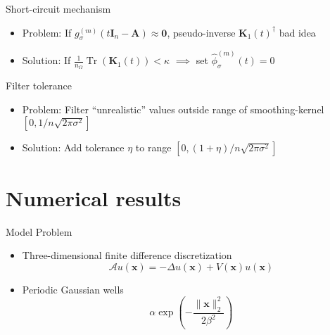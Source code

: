 \documentclass[aspectratio=169, 12pt]{beamer}
\newcommand{\mtx}[1]{\boldsymbol{#1}}
\newcommand{\vct}[1]{\boldsymbol{#1}}
\DeclareMathOperator{\Tr}{Tr}
\begin{document}
\begin{frame}{Short-circuit mechanism}
    \begin{itemize}
        \item Problem: If $g_{\sigma}^{(m)}(t\mtx{I}_n - \mtx{A}) \approx \mtx{0}$, pseudo-inverse $\mtx{K}_1(t)^{\dagger}$ bad idea
        \item Solution: If $\frac{1}{n_{\Omega}} \Tr(\mtx{K}_1(t)) < \kappa$ $\implies$ set $\widehat{\phi}_{\sigma}^{(m)}(t) = 0$
    \end{itemize}
    \centering
    \scalebox{0.8}{}
\end{frame}

\begin{frame}{Filter tolerance}
    \begin{itemize}
        \item Problem: Filter \enquote{unrealistic} values outside range of \gls{smoothing-kernel} $[0, 1/n\sqrt{2\pi\sigma^2}]$
        \item Solution: Add tolerance $\eta$ to range $[0, (1 + \eta)/n\sqrt{2\pi\sigma^2}]$
    \end{itemize}
    \centering
    \scalebox{0.8}{}
\end{frame}

\section{Numerical results}

\begin{frame}{Model Problem}
    \begin{itemize}
        \item Three-dimensional finite difference discretization \cite{lin2017randomized}
        \begin{equation}
            \mathcal{A} u(\vct{x}) = - \Delta u(\vct{x}) + V(\vct{x}) u(\vct{x})
        \end{equation}
        \item Periodic Gaussian wells
        \begin{equation}
            \alpha \exp(-\frac{\lVert \vct{x} \rVert _2^2}{ 2 \beta^2 })
        \end{equation}
    \end{itemize}
    \scalebox{0.85}{}
    \scalebox{0.85}{}
    \scalebox{0.85}{}
\end{frame}
\end{document}
